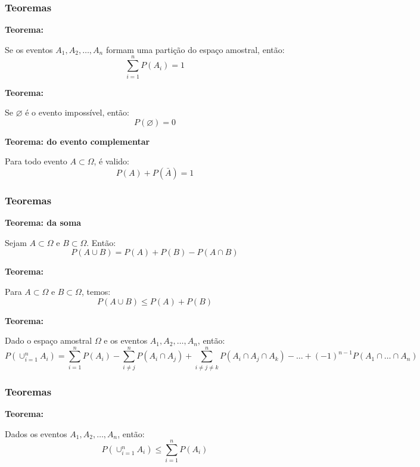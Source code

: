 \documentclass[hyperref={pdfpagelabels=false}]{beamer}
\begin{document}
\begin{frame}
\frametitle{Teoremas}
{\bf Teorema:}

	Se os eventos $A_1,A_2,\dots,A_n$ formam uma partição do espaço amostral, então:
	$$\displaystyle \sum_{i = 1}^{n}P(A_i) = 1$$
\pause

{\bf Teorema:}

	Se $\varnothing$ é o evento impossível, então:
	$$P(\varnothing) = 0$$

\pause

{\bf Teorema: do evento complementar}

	Para todo evento $A \subset \Omega$, é valido:
	$$P(A) + P(\bar{A}) = 1$$

\end{frame}

\begin{frame}
	\frametitle{Teoremas}

{\bf Teorema: da soma}

Sejam $A \subset \Omega$ e $B \subset \Omega$. Então:
$$P(A \cup B) = P(A) + P(B) - P(A \cap B)$$
\pause

{\bf Teorema:}

	Para $A \subset \Omega$ e $B \subset \Omega$, temos:
	$$P(A \cup B) \leq P(A) + P(B)$$
\pause

{\bf Teorema:}

	Dado o espaço amostral $\Omega$ e os eventos $A_1, A_2, \dots, A_n$, então:
	\footnotesize{
	$$P\left(\displaystyle\cup_{i=1}^{n} A_i \right) = \displaystyle \sum_{i = 1}^{n}P(A_i) - \displaystyle \sum_{i \neq j}^{n}P(A_i \cap A_j) + \displaystyle \sum_{i \neq j \neq k}^{n}P(A_i \cap A_j \cap A_k) - \dots + (-1)^{n-1}P(A_1\cap\dots\cap A_n)$$}
\end{frame}

\begin{frame}
	\frametitle{Teoremas}

{\bf Teorema:}

	Dados os eventos $A_1,A_2,\dots,A_n$, então:
	$$P\left( \displaystyle \cup_{i=1}^{n} A_i \right) \leq \displaystyle \sum_{i = 1}^{n}P(A_i)$$

\end{frame}
\end{document}
